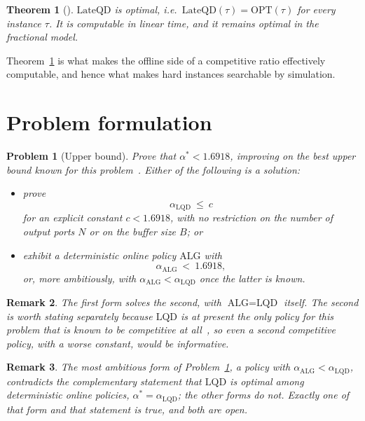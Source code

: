 \documentclass[10pt]{article}
\newtheorem{problem}{Problem}
\newtheorem{theorem}{Theorem}
\newtheorem{remark}[theorem]{Remark}
\newcommand{\LQD}{\text{LQD}}
\newcommand{\LateQD}{\text{LateQD}}
\newcommand{\ALG}{\text{ALG}}
\newcommand{\OPT}{\text{OPT}}
\begin{document}
\begin{theorem}[\cite{BDGN19}]\label{thm:lateqd}
$\LateQD$ is optimal, i.e.\ $\LateQD(\tau)=\OPT(\tau)$ for every instance
$\tau$. It is computable in linear time, and it remains optimal in the
fractional model.
\end{theorem}

Theorem~\ref{thm:lateqd} is what makes the offline side of a competitive ratio
effectively computable, and hence what makes hard instances searchable by
simulation.

\section{Problem formulation}

\begin{problem}[Upper bound]\label{prob:upper}
Prove that $\alpha^{*}<1.6918$, improving on the best upper bound known for
this problem~\cite{AEMV21,AEMV24}. Either of the following is a solution:
\begin{itemize}
    \item prove
    \[
    \alpha_{\LQD}\ \le\ c
    \]
    for an explicit constant $c<1.6918$, with no restriction on the number of
    output ports $N$ or on the buffer size $B$; or
    \item exhibit a deterministic online policy $\ALG$ with
    \[
    \alpha_{\ALG}\ <\ 1.6918 ,
    \]
    or, more ambitiously, with $\alpha_{\ALG}<\alpha_{\LQD}$ once the latter is
    known.
\end{itemize}
\end{problem}

\begin{remark}\label{rem:secondpolicy}
The first form solves the second, with $\ALG=\LQD$ itself. The second is worth
stating separately because $\LQD$ is at present the only policy for this
problem that is known to be competitive at all~\cite{AEMV24}, so even a second
competitive policy, with a worse constant, would be informative.
\end{remark}

\begin{remark}\label{rem:implies}
The most ambitious form of Problem~\ref{prob:upper}, a policy with
$\alpha_{\ALG}<\alpha_{\LQD}$, contradicts the complementary statement that
$\LQD$ is optimal among deterministic online policies,
$\alpha^{*}=\alpha_{\LQD}$; the other forms do not. Exactly one of that form
and that statement is true, and both are open.
\end{remark}
\end{document}
